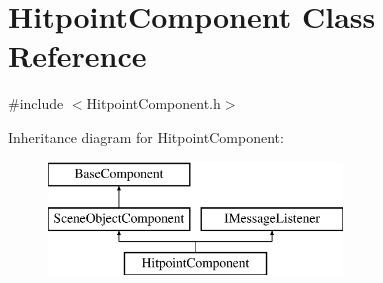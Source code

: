 \hypertarget{class_hitpoint_component}{}\section{Hitpoint\+Component Class Reference}
\label{class_hitpoint_component}


{\ttfamily \#include $<$Hitpoint\+Component.\+h$>$}

Inheritance diagram for Hitpoint\+Component\+:\begin{figure}[H]
\begin{center}
\leavevmode
\includegraphics[height=3.000000cm]{class_hitpoint_component}
\end{center}
\end{figure}
